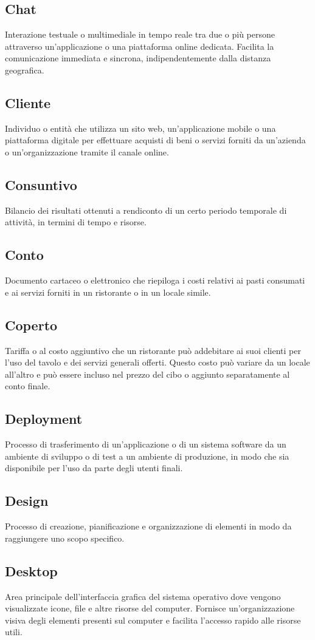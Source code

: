 \subsection{Chat}Interazione testuale o multimediale in tempo reale tra due o più persone attraverso un'applicazione o una piattaforma online dedicata. Facilita la comunicazione immediata e sincrona, indipendentemente dalla distanza geografica.
\subsection{Cliente}Individuo o entità che utilizza un sito web, un'applicazione mobile o una piattaforma digitale per effettuare acquisti di beni o servizi forniti da un'azienda o un'organizzazione tramite il canale online.
\subsection{Consuntivo}Bilancio dei risultati ottenuti a rendiconto di un certo periodo temporale di attività, in termini di tempo e risorse.
\subsection{Conto}Documento cartaceo o elettronico che riepiloga i costi relativi ai pasti consumati e ai servizi forniti in un ristorante o in un locale simile.
\subsection{Coperto}Tariffa o al costo aggiuntivo che un ristorante può addebitare ai suoi clienti per l'uso del tavolo e dei servizi generali offerti. Questo costo può variare da un locale all'altro e può essere incluso nel prezzo del cibo o aggiunto separatamente al conto finale.
\subsection{Deployment}Processo di trasferimento di un'applicazione o di un sistema software da un ambiente di sviluppo o di test a un ambiente di produzione, in modo che sia disponibile per l'uso da parte degli utenti finali.
\subsection{Design}Processo di creazione, pianificazione e organizzazione di elementi in modo da raggiungere uno scopo specifico.
\subsection{Desktop}Area principale dell'interfaccia grafica del sistema operativo dove vengono visualizzate icone, file e altre risorse del computer. Fornisce un'organizzazione visiva degli elementi presenti sul computer e facilita l'accesso rapido alle risorse utili.
